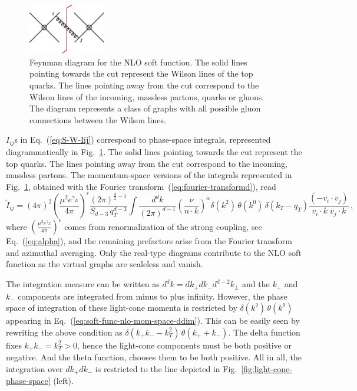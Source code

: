 \documentclass[a4paper,11pt]{article}
\numberwithin{equation}{section}
\begin{document}
\begin{figure}[t]
  \begin{center}
    \hspace{40pt}
    \includegraphics[width=0.30\textwidth]{plots/sf-nlo.png}
  \end{center}
  \caption{Feynman diagram for the NLO soft function.  The solid lines pointing
  towards the cut represent the Wilson lines of the top quarks. The lines
  pointing away from the cut correspond to the Wilson lines of the incoming,
  massless partons, quarks or gluons. The diagram represents a class of graphs
  with all possible gluon connections between the Wilson lines.
  }
  \label{fig:sf-nlo}
\end{figure}

$I_{ij}$s in Eq.~(\ref{eq:S-W-Iij}) correspond to phase-space integrals,
represented diagrammatically in Fig.~\ref{fig:sf-nlo}.
The solid lines pointing towards the cut represent the 
top quarks. The lines pointing away from the cut correspond to the
incoming, massless partons.
%
The momentum-space versions of the integrals represented in
Fig.~\ref{fig:sf-nlo}, obtained with the Fourier
transform~(\ref{eq:fourier-transformd}), read
%
\begin{equation}
  \tilde I_{ij} =  
  (4\pi)^2  \left(\frac{\mu^2 e^{\gamma_E}}{4\pi}\right)^\epsilon 
    \frac{(2\pi)^{\frac{d}{2}-1}}{ S_{d-3}\, q_T^{d-3}} 
  \int \frac{d^d k}{(2\pi)^{d-1}}
  \left(\frac{\nu}{n\cdot k}\right)^\alpha
  \delta(k^2)\, \theta(k^0)\,
  \delta(k_T - q_T)
  \frac{(-v_i \cdot v_j)}{v_i \cdot k\; v_j \cdot k}\,,
  \label{eq:soft-func-nlo-mom-space-ddim}
\end{equation}
%
where $\left(\frac{\mu^2 e^{\gamma_E}}{4\pi}\right)^\epsilon$ comes from
renormalization of the strong coupling, see Eq.~(\ref{eq:alpha}), and the remaining
prefactors arise from the Fourier transform and azimuthal averaging.
%
Only the real-type diagrams contribute to the NLO soft function as the virtual
graphs are scaleless and vanish.

The integration measure can be written as $d^d k = d k_+ d k_- d^{d-2} k_\perp$
and the $k_+$ and $k_-$ components are integrated from minus to plus infinity.
However, the phase space of integration of these light-cone momenta is
restricted by $\delta(k^2)\, \theta(k^0)$ appearing in
Eq.~(\ref{eq:soft-func-nlo-mom-space-ddim}).  This can be easily seen by
rewriting the above condition as $\delta(k_+ k_- - k_T^2)\, \theta(k_+ + k_-)$.
The delta function fixes $k_+ k_- = k_T^2 > 0$, hence the light-cone components
must be both positive or negative.  And the theta function, chooses them to be
both positive. All in all, the integration over $d k_+ d k_-$ is restricted to
the line depicted in Fig.~\ref{fig:light-cone-phase-space} (left).
\end{document}
